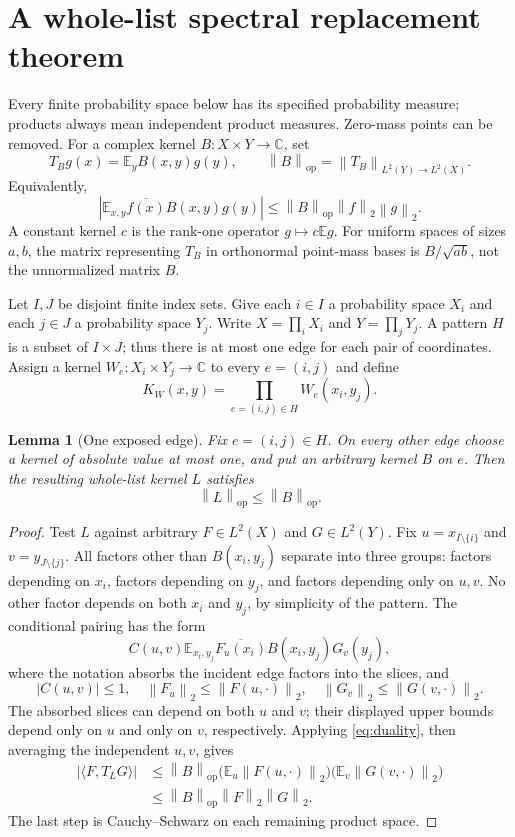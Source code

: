 \documentclass[11pt,a4paper]{article}
\numberwithin{equation}{section}
\newtheorem{lemma}[theorem]{Lemma}
\theoremstyle{definition}
\theoremstyle{remark}
\newcommand{\E}{\mathbb E}
\newcommand{\C}{\mathbb C}
\newcommand{\op}{\mathrm{op}}
\newcommand{\norm}[1]{\left\lVert #1\right\rVert}
\newcommand{\abs}[1]{\left\lvert #1\right\rvert}
\begin{document}
\section{A whole-list spectral replacement theorem}
\label{sec:replacement}

Every finite probability space below has its specified probability
measure; products always mean independent product measures. Zero-mass
points can be removed. For a complex kernel $B:X\times Y\to\C$, set
\[
 T_Bg(x)=\E_y B(x,y)g(y),\qquad
 \norm{B}_{\op}=\norm{T_B}_{L^2(Y)\to L^2(X)}.
\]
Equivalently,
\begin{equation}
 \abs{\E_{x,y}\overline{f(x)}B(x,y)g(y)}
 \le \norm{B}_{\op}\norm f_2\norm g_2.
 \label{eq:duality}
\end{equation}
A constant kernel $c$ is the rank-one operator $g\mapsto c\E g$.
For uniform spaces of sizes $a,b$, the matrix representing $T_B$ in
orthonormal point-mass bases is $B/\sqrt{ab}$, not the unnormalized
matrix $B$.

Let $I,J$ be disjoint finite index sets. Give each $i\in I$ a probability
space $X_i$ and each $j\in J$ a probability space $Y_j$. Write
$X=\prod_iX_i$ and $Y=\prod_jY_j$. A pattern $H$ is a subset of
$I\times J$; thus there is at most one edge for each pair of coordinates.
Assign a kernel $W_e:X_i\times Y_j\to\C$ to every $e=(i,j)$ and define
\[
 K_W(x,y)=\prod_{e=(i,j)\in H}W_e(x_i,y_j).
\]

\begin{lemma}[One exposed edge]
\label{lem:exposed}
Fix $e=(i,j)\in H$. On every other edge choose a kernel of absolute
value at most one, and put an arbitrary kernel $B$ on $e$. Then the
resulting whole-list kernel $L$ satisfies
\[
 \norm L_{\op}\le\norm B_{\op}.
\]
\end{lemma}
\begin{proof}
Test $L$ against arbitrary $F\in L^2(X)$ and $G\in L^2(Y)$.
Fix $u=x_{I\setminus\{i\}}$ and $v=y_{J\setminus\{j\}}$.
All factors other than $B(x_i,y_j)$ separate into three groups: factors
depending on $x_i$, factors depending on $y_j$, and factors depending
only on $u,v$. No other factor depends on both $x_i$ and $y_j$, by
simplicity of the pattern. The conditional pairing has the form
\[
 C(u,v)\E_{x_i,y_j}\overline{F_u(x_i)}B(x_i,y_j)G_v(y_j),
\]
where the notation absorbs the incident edge factors into the slices,
and
\[
 |C(u,v)|\le1,\quad
 \norm{F_u}_2\le\norm{F(u,\cdot)}_2,\quad
 \norm{G_v}_2\le\norm{G(v,\cdot)}_2.
\]
The absorbed slices can depend on both $u$ and $v$; their displayed
upper bounds depend only on $u$ and only on $v$, respectively.
Applying \eqref{eq:duality}, then averaging the independent $u,v$, gives
\begin{align*}
 |\langle F,T_LG\rangle|
 &\le\norm B_{\op}
   \bigl(\E_u\norm{F(u,\cdot)}_2\bigr)
   \bigl(\E_v\norm{G(v,\cdot)}_2\bigr)\\
 &\le\norm B_{\op}\norm F_2\norm G_2.
\end{align*}
The last step is Cauchy--Schwarz on each remaining product space.
\end{proof}
\end{document}
